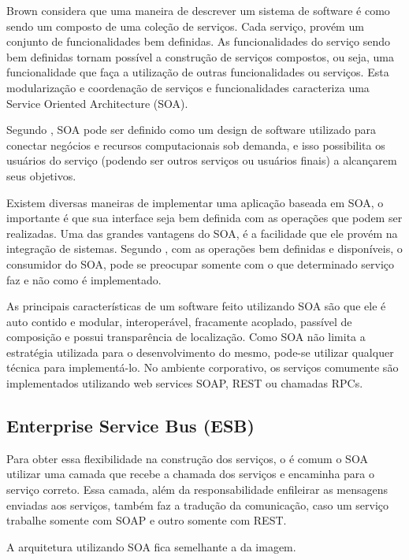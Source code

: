 Brown considera que uma maneira de descrever um sistema de software é como sendo um composto de 
uma coleção de serviços. Cada serviço, provém um conjunto de funcionalidades bem definidas. 
As funcionalidades do serviço sendo bem definidas tornam possível a construção de serviços 
compostos, ou seja, uma funcionalidade que faça a utilização de outras funcionalidades ou serviços. 
Esta modularização e coordenação de serviços e funcionalidades caracteriza uma 
Service Oriented Architecture (SOA).

Segundo \cite{valipour}, SOA pode ser definido como um design de software utilizado para 
conectar negócios e recursos computacionais sob demanda, e isso possibilita os usuários 
do serviço (podendo ser outros serviços ou usuários finais) a alcançarem seus objetivos. 

Existem diversas maneiras de implementar uma aplicação baseada em SOA, o importante é que 
sua interface seja bem definida com as operações que podem ser realizadas. 
Uma das grandes vantagens do SOA, é a facilidade que ele provém na integração de sistemas. 
Segundo \cite{valipour}, com as operações bem definidas e disponíveis, o consumidor do SOA, 
pode se preocupar somente com o que determinado serviço faz e não como é implementado.

As principais características de um software feito utilizando SOA são que ele é auto contido e 
modular, interoperável, fracamente acoplado, passível de composição e possui transparência de localização. 
Como SOA não limita a estratégia utilizada para o desenvolvimento do mesmo, pode-se utilizar qualquer 
técnica para implementá-lo. No ambiente corporativo, os serviços comumente são implementados 
utilizando web services SOAP, REST ou chamadas RPCs.

\subsection{Enterprise Service Bus (ESB)}

Para obter essa flexibilidade na construção dos serviços, o é comum o SOA utilizar
uma camada que recebe a chamada dos serviços e encaminha para o serviço correto.
Essa camada, além da responsabilidade enfileirar as mensagens enviadas aos serviços,
também faz a tradução da comunicação, caso um serviço trabalhe somente com SOAP e outro somente
com REST.

A arquitetura utilizando SOA fica semelhante a da imagem.

